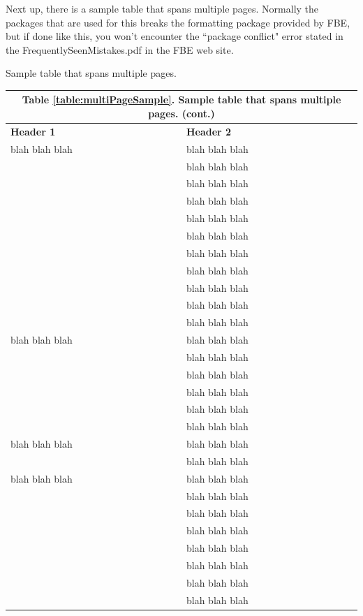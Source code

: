\documentclass[a4paper,oneside,12pt]{report}
\numberwithin{equation}{chapter}
\begin{document}
Next up, there is a sample table that spans multiple pages. Normally the packages that are used for this breaks the formatting package provided by FBE, but if done like this, you won't encounter the ``package conflict" error stated in the FrequentlySeenMistakes.pdf in the FBE web site.
\clearpage

\begingroup
\begin{table}[thbp]
	\caption[Sample table that spans multiple pages.]{Sample table that spans multiple pages.}
	\label{table:multiPageSample}
\end{table}
\begin{center}
	\addtocounter{table}{-1}
	\begin{longtable}{|l|l|}\hline
		\endfirsthead
		\multicolumn{2}{c}{Table \ref{table:multiPageSample}. Sample table that spans multiple pages. (cont.) \vspace{1em}} \\\hline
		\endhead
		\endfoot
		\endlastfoot
		
		\textbf{Header 1}& \textbf{Header 2}\\\hline
		blah blah blah & blah blah blah \\
		& blah blah blah \\
		& blah blah blah \\
		& blah blah blah \\
		& blah blah blah \\
		& blah blah blah \\
		& blah blah blah \\
		& blah blah blah \\
		& blah blah blah \\
		& blah blah blah \\
		& blah blah blah \\\hline
		
		blah blah blah & blah blah blah \\
		& blah blah blah \\
		& blah blah blah \\
		& blah blah blah \\
		& blah blah blah \\
		& blah blah blah \\\hline
		
		blah blah blah & blah blah blah \\
		& blah blah blah \\\hline
		blah blah blah & blah blah blah \\
		& blah blah blah \\
		& blah blah blah \\
		& blah blah blah \\
		& blah blah blah \\
		& blah blah blah \\
		& blah blah blah \\
		& blah blah blah \\\hline
		

\end{longtable}
\end{center}
\end{document}
